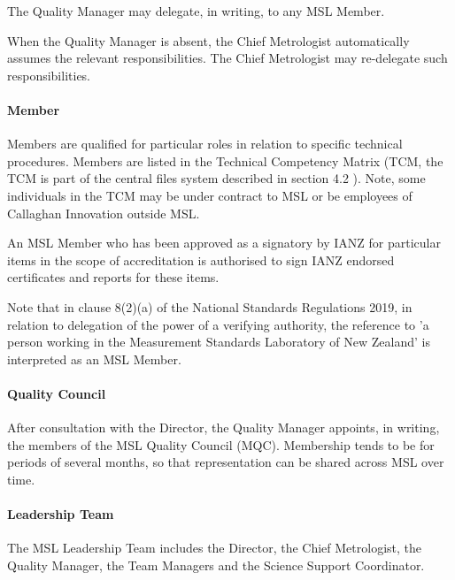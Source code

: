 The Quality Manager may delegate, in writing, to any MSL Member.

When the Quality Manager is absent, the Chief Metrologist automatically assumes the relevant responsibilities.  The Chief Metrologist may re-delegate such responsibilities. 
%
\paragraph{Member}
Members are qualified for particular roles in relation to specific technical procedures. Members are listed in the Technical Competency Matrix (TCM, the TCM is part of the central files system described in section 4.2 ). Note, some individuals in the TCM may be under contract to MSL or be employees of Callaghan Innovation outside MSL. 

An MSL Member who has been approved as a signatory by IANZ for particular items in the scope of accreditation is authorised to sign IANZ endorsed certificates and reports for these items.


{Note that in clause 8(2)(a) of the National Standards Regulations 2019, in relation to delegation of the power of a verifying authority, the reference to 'a person working in the Measurement Standards Laboratory of New Zealand' is interpreted as an MSL Member.}

\paragraph{Quality Council}
After consultation with the Director, the Quality Manager appoints, in writing, the members of the MSL Quality Council (MQC). Membership tends to be for periods of several months, so that representation can be shared across MSL over time.

\paragraph{Leadership Team}
The MSL Leadership Team includes the Director, the Chief Metrologist, the Quality Manager, the 
Team Managers and the Science Support Coordinator. 

